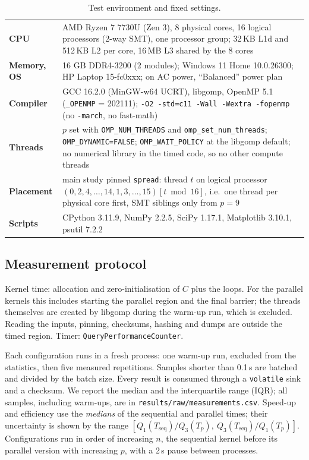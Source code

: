 \documentclass[11pt,a4paper]{article}
\newcommand{\concept}[1]{\par\addvspace{8pt}\Needspace{5\baselineskip}%
  \noindent{\color{accent}\bfseries\boldmath #1}\par\nopagebreak\vspace{2pt}}
\begin{document}
\begin{table}[H]
\centering
\caption{Test environment and fixed settings.}
\label{tab:env}
\begin{tabularx}{\linewidth}{@{}>{\bfseries\color{accent}}l X@{}}
\toprule
CPU & AMD Ryzen 7 7730U (Zen 3), 8 physical cores, 16 logical processors (2-way SMT), one processor group; 32\,KB L1d and 512\,KB L2 per core, 16\,MB L3 shared by the 8 cores \cite{amd} \\
Memory, OS & 16 GB DDR4-3200 (2 modules); Windows 11 Home 10.0.26300; HP Laptop 15-fc0xxx; on AC power, ``Balanced'' power plan \\
Compiler & GCC 16.2.0 (MinGW-w64 UCRT), libgomp, OpenMP 5.1 (\texttt{\_OPENMP} = 202111); \texttt{-O2 -std=c11 -Wall -Wextra -fopenmp} (no \texttt{-march}, no fast-math) \\
Threads & $p$ set with \texttt{OMP\_NUM\_THREADS} and \texttt{omp\_set\_num\_threads}; \texttt{OMP\_DYNAMIC=FALSE}; \texttt{OMP\_WAIT\_POLICY} at the libgomp default; no numerical library in the timed code, so no other compute threads \\
Placement & main study pinned \texttt{spread}: thread $t$ on logical processor $(0,2,4,\dots,14,1,3,\dots,15)[t \bmod 16]$, i.e.\ one thread per physical core first, SMT siblings only from $p=9$ \\
Scripts & CPython 3.11.9, NumPy 2.2.5, SciPy 1.17.1, Matplotlib 3.10.1, psutil 7.2.2 \\
\bottomrule
\end{tabularx}
\end{table}

\subsection{Measurement protocol}

\concept{Timing boundary}
Kernel time: allocation and zero-initialisation of $C$ plus the loops. For the parallel kernels
this includes starting the parallel region and the final barrier; the threads themselves are
created by libgomp during the warm-up run, which is excluded. Reading the inputs, pinning,
checksums, hashing and dumps are outside the timed region. Timer:
\texttt{QueryPerformanceCounter}.

\concept{Repetitions and statistics}
Each configuration runs in a fresh process: one warm-up run, excluded from the statistics, then
five measured repetitions. Samples shorter than 0.1\,s are batched and divided by the batch
size. Every result is consumed through a \texttt{volatile} sink and a checksum. We report the
median and the interquartile range (IQR); all samples, including warm-ups, are in
\texttt{results/raw/measurements.csv}. Speed-up and efficiency use the \emph{medians} of the
sequential and parallel times; their uncertainty is shown by the range
$[Q_1(T_\text{seq})/Q_3(T_p),\ Q_3(T_\text{seq})/Q_1(T_p)]$. Configurations run in order of
increasing $n$, the sequential kernel before its parallel version with increasing $p$, with a
2\,s pause between processes.
\end{document}
